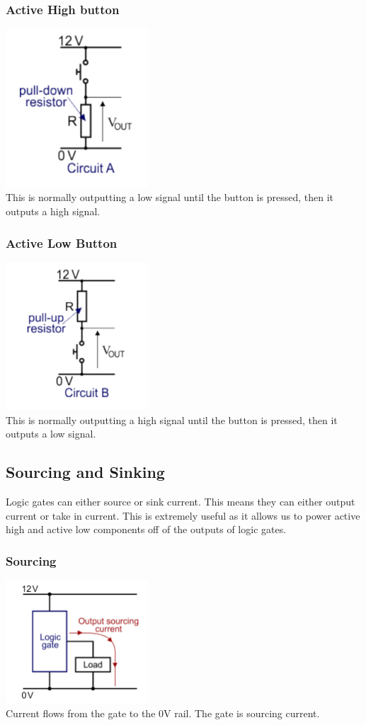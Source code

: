 \documentclass[a4paper,11pt, twocolumn]{article}
\begin{document}
\subsubsection{Active High button}
\includegraphics[width=0.4\textwidth]{activeHighButton.PNG}\\
This is normally outputting a low signal until the button is pressed, then it outputs a high signal.
\subsubsection{Active Low Button}
\includegraphics[width=0.4\textwidth]{activeLowButton.PNG}\\
This is normally outputting a high signal until the button is pressed, then it outputs a low signal.
\subsection{Sourcing and Sinking}
Logic gates can either source or sink current. This means they can either output current or take in current. This is extremely useful as it allows us to power active high and active low components off of the outputs of logic gates.
\subsubsection{Sourcing}
\includegraphics[width=0.4\textwidth]{sourcing.PNG}\\
Current flows from the gate to the 0V rail. The gate is sourcing current.
\end{document}
